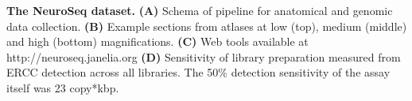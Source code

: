 \textbf{The NeuroSeq dataset.}
\textbf{(A)} Schema of pipeline for anatomical and genomic data collection.
\textbf{(B)} Example sections from atlases at low (top), medium (middle) and high (bottom) magnifications.
\textbf{(C)} Web tools available at http://neuroseq.janelia.org
\textbf{(D)} Sensitivity of library preparation measured from ERCC detection across all libraries. The 50\% detection sensitivity of the assay itself was 23 copy*kbp. 